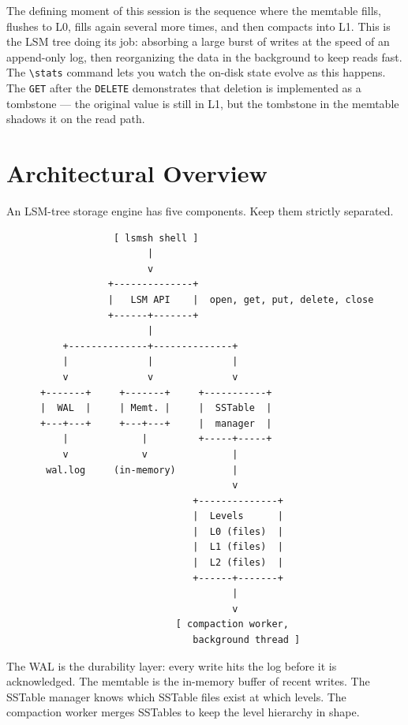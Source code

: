 \documentclass[11pt,a4paper]{article}
\begin{document}
The defining moment of this session is the sequence where the memtable fills, flushes to L0, fills again several more times, and then compacts into L1. This is the LSM tree doing its job: absorbing a large burst of writes at the speed of an append-only log, then reorganizing the data in the background to keep reads fast. The \verb|\stats| command lets you watch the on-disk state evolve as this happens. The \texttt{GET} after the \texttt{DELETE} demonstrates that deletion is implemented as a tombstone --- the original value is still in L1, but the tombstone in the memtable shadows it on the read path.

\section{Architectural Overview}

An LSM-tree storage engine has five components. Keep them strictly separated.

\begin{codebox}
\begin{lstlisting}
                   [ lsmsh shell ]
                         |
                         v
                  +--------------+
                  |   LSM API    |  open, get, put, delete, close
                  +------+-------+
                         |
          +--------------+--------------+
          |              |              |
          v              v              v
      +-------+     +-------+     +-----------+
      |  WAL  |     | Memt. |     |  SSTable  |
      +---+---+     +---+---+     |  manager  |
          |             |         +-----+-----+
          v             v               |
       wal.log     (in-memory)          |
                                        v
                                 +--------------+
                                 |  Levels      |
                                 |  L0 (files)  |
                                 |  L1 (files)  |
                                 |  L2 (files)  |
                                 +------+-------+
                                        |
                                        v
                              [ compaction worker,
                                 background thread ]
\end{lstlisting}
\end{codebox}

The WAL is the durability layer: every write hits the log before it is acknowledged. The memtable is the in-memory buffer of recent writes. The SSTable manager knows which SSTable files exist at which levels. The compaction worker merges SSTables to keep the level hierarchy in shape.
\end{document}
